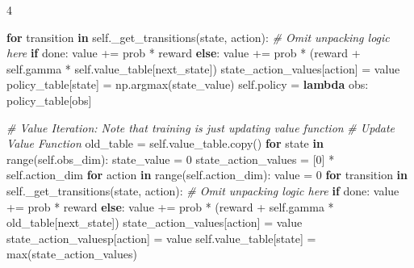 \documentclass{article}
\newenvironment{Shaded}{\CodeFontSize\setlength{\topsep}{\CodeBlockSkip}\setlength{\partopsep}{0pt}}{}
\newcommand{\BuiltInTok}[1]{\textcolor[rgb]{0.00,0.50,0.00}{#1}}
\newcommand{\CommentTok}[1]{\textcolor[rgb]{0.38,0.63,0.69}{\textit{#1}}}
\newcommand{\ControlFlowTok}[1]{\textcolor[rgb]{0.00,0.44,0.13}{\textbf{#1}}}
\newcommand{\DecValTok}[1]{\textcolor[rgb]{0.25,0.63,0.44}{#1}}
\newcommand{\KeywordTok}[1]{\textcolor[rgb]{0.00,0.44,0.13}{\textbf{#1}}}
\newcommand{\NormalTok}[1]{#1}
\newcommand{\OperatorTok}[1]{\textcolor[rgb]{0.40,0.40,0.40}{#1}}
\newcommand{\VariableTok}[1]{\textcolor[rgb]{0.10,0.09,0.49}{#1}}
\newcommand{\CodeFontSize}{\fontsize{3.6}{4}\selectfont}
\newlength{\CodeBlockSkip}
\newcommand{\NumCodeColumns}{4}  %
\begin{document}
\begin{multicols*}{\NumCodeColumns}
\begin{Shaded}
\begin{Highlighting}[]
    \ControlFlowTok{for}\NormalTok{ transition }\KeywordTok{in} \VariableTok{self}\NormalTok{.\_get\_transitions(state, action):}
      \CommentTok{\# Omit unpacking logic here}
      \ControlFlowTok{if}\NormalTok{ done:}
\NormalTok{        value }\OperatorTok{+=}\NormalTok{ prob }\OperatorTok{*}\NormalTok{ reward}
      \ControlFlowTok{else}\NormalTok{:}
\NormalTok{        value }\OperatorTok{+=}\NormalTok{ prob }\OperatorTok{*}\NormalTok{ (reward }\OperatorTok{+} \VariableTok{self}\NormalTok{.gamma }\OperatorTok{*} \VariableTok{self}\NormalTok{.value\_table[next\_state])}
\NormalTok{    state\_action\_values[action] }\OperatorTok{=}\NormalTok{ value}
\NormalTok{  policy\_table[state] }\OperatorTok{=}\NormalTok{ np.argmax(state\_value)}
\VariableTok{self}\NormalTok{.policy }\OperatorTok{=} \KeywordTok{lambda}\NormalTok{ obs: policy\_table[obs]}
\end{Highlighting}
\end{Shaded}

\begin{Shaded}
\begin{Highlighting}[]
\CommentTok{\# Value Iteration: Note that training is just updating value function}
\CommentTok{\# Update Value Function}
\NormalTok{old\_table }\OperatorTok{=} \VariableTok{self}\NormalTok{.value\_table.copy()}
\ControlFlowTok{for}\NormalTok{ state }\KeywordTok{in} \BuiltInTok{range}\NormalTok{(}\VariableTok{self}\NormalTok{.obs\_dim):}
\NormalTok{  state\_value }\OperatorTok{=} \DecValTok{0}
\NormalTok{  state\_action\_values }\OperatorTok{=}\NormalTok{ [}\DecValTok{0}\NormalTok{] }\OperatorTok{*} \VariableTok{self}\NormalTok{.action\_dim}
  \ControlFlowTok{for}\NormalTok{ action }\KeywordTok{in} \BuiltInTok{range}\NormalTok{(}\VariableTok{self}\NormalTok{.action\_dim):}
\NormalTok{    value }\OperatorTok{=} \DecValTok{0}
    \ControlFlowTok{for}\NormalTok{ transition }\KeywordTok{in} \VariableTok{self}\NormalTok{.\_get\_transitions(state, action):}
      \CommentTok{\# Omit unpacking logic here}
      \ControlFlowTok{if}\NormalTok{ done:}
\NormalTok{        value }\OperatorTok{+=}\NormalTok{ prob }\OperatorTok{*}\NormalTok{ reward}
      \ControlFlowTok{else}\NormalTok{:}
\NormalTok{          value }\OperatorTok{+=}\NormalTok{ prob }\OperatorTok{*}\NormalTok{ (reward }\OperatorTok{+} \VariableTok{self}\NormalTok{.gamma }\OperatorTok{*}\NormalTok{ old\_table[next\_state])}
\NormalTok{      state\_action\_values[action] }\OperatorTok{=}\NormalTok{ value}
\NormalTok{    state\_action\_valuesp[action] }\OperatorTok{=}\NormalTok{ value}
  \VariableTok{self}\NormalTok{.value\_table[state] }\OperatorTok{=} \BuiltInTok{max}\NormalTok{(state\_action\_values)}
\end{Highlighting}
\end{Shaded}


\end{multicols*}
\end{document}
